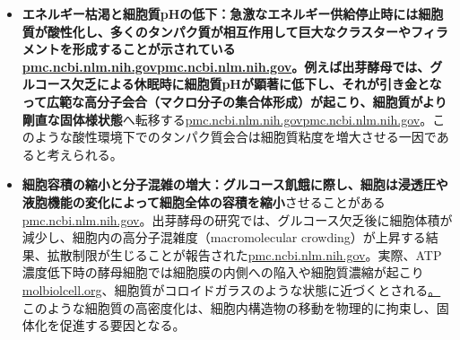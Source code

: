 \begin{itemize}
    \item \textbf{エネルギー枯渇と細胞質pHの低下：\textbf{急激なエネルギー供給停止時には細胞質が酸性化し、多くのタンパク質が相互作用して巨大なクラスターやフィラメントを形成することが示されている\href{https://pmc.ncbi.nlm.nih.gov/articles/PMC4850707/\#:~:text=it\%20to\%20be\%20associated\%20with,fluid\%20that\%20can\%20reversibly\%20transition}{pmc.ncbi.nlm.nih.gov}\href{https://pmc.ncbi.nlm.nih.gov/articles/PMC4850707/\#:~:text=Now\%2C\%20Munder\%20et\%20al,in\%20the\%20cytoplasm\%20becoming\%20stiffer}{pmc.ncbi.nlm.nih.gov}。例えば出芽酵母では、グルコース欠乏による休眠時に細胞質pHが顕著に低下し、それが引き金となって}広範な高分子会合（マクロ分子の集合体形成）\textbf{が起こり、細胞質が}より剛直な固体様状態}へ転移する\href{https://pmc.ncbi.nlm.nih.gov/articles/PMC4850707/\#:~:text=it\%20to\%20be\%20associated\%20with,fluid\%20that\%20can\%20reversibly\%20transition}{pmc.ncbi.nlm.nih.gov}\href{https://pmc.ncbi.nlm.nih.gov/articles/PMC4850707/\#:~:text=Now\%2C\%20Munder\%20et\%20al,in\%20the\%20cytoplasm\%20becoming\%20stiffer}{pmc.ncbi.nlm.nih.gov}。このような酸性環境下でのタンパク質会合は細胞質粘度を増大させる一因であると考えられる。
    \item \textbf{細胞容積の縮小と分子混雑の増大：\textbf{グルコース飢餓に際し、細胞は浸透圧や液胞機能の変化によって}細胞全体の容積を縮小}させることがある\href{https://pmc.ncbi.nlm.nih.gov/articles/PMC6857596/\#:~:text=organisation,high\%20amounts\%20of\%20carbohydrates\%2C\%20possibly}{pmc.ncbi.nlm.nih.gov}。出芽酵母の研究では、グルコース欠乏後に細胞体積が減少し、細胞内の高分子混雑度（macromolecular crowding）が上昇する結果、拡散制限が生じることが報告された\href{https://pmc.ncbi.nlm.nih.gov/articles/PMC4811765/\#:~:text=undertakes\%20a\%20startling\%20transition\%20upon,which\%20cells\%20globally\%20alter\%20their}{pmc.ncbi.nlm.nih.gov}。実際、ATP濃度低下時の酵母細胞では細胞膜の内側への陥入や細胞質濃縮が起こり\href{https://www.molbiolcell.org/doi/10.1091/mbc.E20-02-0125\#:~:text=induces\%20a\%20massive\%20reorganization\%20of,a\%20\%E2\%80\%9Csolidification\%E2\%80\%9D\%20of\%20the\%20cytoplasm}{molbiolcell.org}、細胞質がコロイドガラスのような状態に近づくとされる\href{https://pmc.ncbi.nlm.nih.gov/articles/PMC6857596/\#:~:text=organisation,high\%20amounts\%20of\%20carbohydrates\%2C\%20possibly}。このような細胞質の高密度化は、細胞内構造物の移動を物理的に拘束し、固体化を促進する要因となる。

\end{itemize}
